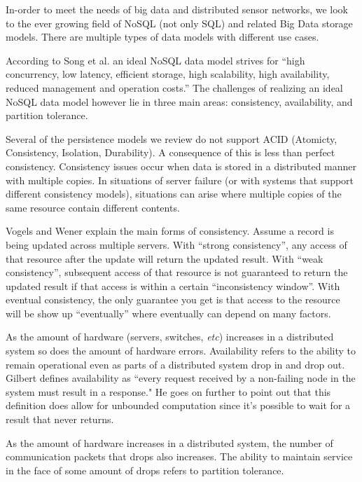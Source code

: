 \documentclass[]{article}
\begin{document}
In-order to meet the needs of big data and distributed sensor networks, we look to the ever growing field of NoSQL (not only SQL) and related Big Data storage models. There are multiple types of data models with different use cases.

According to Song et al.\cite{5980904} an ideal NoSQL data model strives for ``high concurrency, low latency, efficient storage, high scalability, high availability, reduced management and operation costs.'' The challenges of realizing an ideal NoSQL data model however lie in three main areas\cite{chen_big_2014}: consistency, availability, and partition tolerance. 

Several of the persistence models we review do not support ACID (Atomicty, Consistency, Isolation, Durability). A consequence of this is less than perfect consistency. Consistency issues occur when data is stored in a distributed manner with multiple copies. In situations of server failure (or with systems that support different consistency models), situations can arise where multiple copies of the same resource contain different contents. 

Vogels and Wener\cite{vogels_eventually_2008} explain the main forms of consistency. Assume a record is being updated across multiple servers. With ``strong consistency'', any access of that resource after the update will return the updated result. With ``weak consistency'', subsequent access of that resource is not guaranteed to return the updated result if that access is within a certain ``inconsistency window''. With eventual consistency, the only guarantee you get is that access to the resource will be show up ``eventually'' where eventually can depend on many factors.

As the amount of hardware (servers, switches, \textit{etc}) increases in a distributed system so does the amount of hardware errors. Availability refers to the ability to remain operational even as parts of a distributed system drop in and drop out\cite{chen_big_2014}. Gilbert\cite{gilbert2002brewer} defines availability as ``every request received by a non-failing node in the system must result in a response." He goes on further to point out that this definition does allow for unbounded computation since it's possible to wait for a result that never returns.

As the amount of hardware increases in a distributed system, the number of communication packets that drops also increases. The ability to maintain service in the face of some amount of drops refers to partition tolerance\cite{chen_big_2014}.
\end{document}
